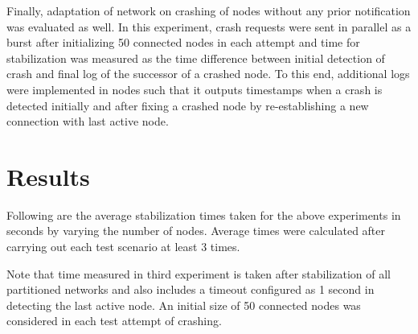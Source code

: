 \documentclass[
    a4paper,
    twocolumn,
]{article}
\begin{document}
Finally, adaptation of network on crashing of nodes without any prior notification was evaluated as well. In this experiment, crash requests were sent in parallel as a burst after initializing 50 connected nodes in each attempt and time for stabilization was measured as the time difference between initial detection of crash and final log of the successor of a crashed node. To this end, additional logs were implemented in nodes such that it outputs timestamps when a crash is detected initially and after fixing a crashed node by re-establishing a new connection with last active node.

\section{Results}

Following are the average stabilization times taken for the above experiments in seconds by varying the number of nodes. Average times were calculated after carrying out each test scenario at least 3 times.\\

\begin{table}[!ht]
\renewcommand{\arraystretch}{1.4}
\centering
{}
\caption{Results of experiments 1 and 2 with average times for stabilization}
\end{table}

Note that time measured in third experiment is taken after stabilization of all partitioned networks and also includes a timeout configured as 1 second in detecting the last active node. An initial size of 50 connected nodes was considered in each test attempt of crashing.
\end{document}
